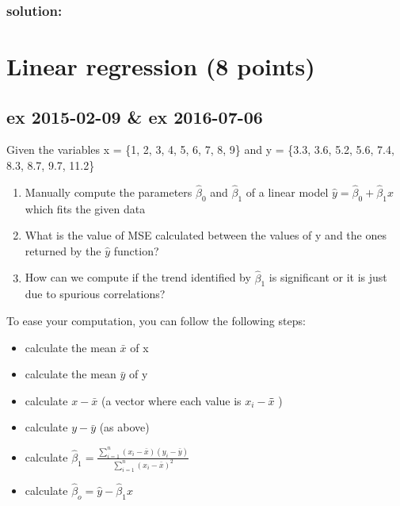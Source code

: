 \documentclass[a4paper,12pt,titlepage]{article} %
\begin{document}
\subsubsection{solution:}


\newpage
\section{Linear regression (8 points)}
\subsection{ex 2015-02-09 \& ex 2016-07-06}
Given the variables x = \{1, 2, 3, 4, 5, 6, 7, 8, 9\} and y = \{3.3, 3.6, 5.2, 5.6, 7.4, 8.3, 8.7, 9.7, 11.2\}
\begin{enumerate}
\item Manually compute the parameters $\hat{\beta}_{0} $ and $\hat{\beta}_{1} $ of a linear model $ \hat{y} = \hat{\beta}_{0} + \hat{\beta}_{1} x$ which fits the given data
\item What is the value of MSE calculated between the values of y and the ones returned by the $\hat{y}$ function?
\item How can we compute if the trend identified by $\hat{\beta}_{1}$ is significant or it is just due to spurious correlations?
\end{enumerate}
 
To ease your computation, you can follow the following steps:
\begin{itemize}
\item calculate the mean $\bar{x}$ of x
\item calculate the mean $\bar{y}$ of y
\item calculate $ x - \bar{x} $ (a vector where each value is $ x_{i} - \bar{x} $̄ )
\item calculate $ y - \bar{y} $ (as above)
\item calculate $ \hat{\beta}_{1} = \frac{\sum_{i=1}^{n} (x_{i}-\bar{x}) (y_{i}-\bar{y})}{ \sum_{i=1}^{n} (x_{i}-\bar{x})^{2} } $
\item calculate $ \hat{\beta}_{o} = \hat{y} - \hat{\beta}_{1} x $
\end{itemize}
\end{document}
